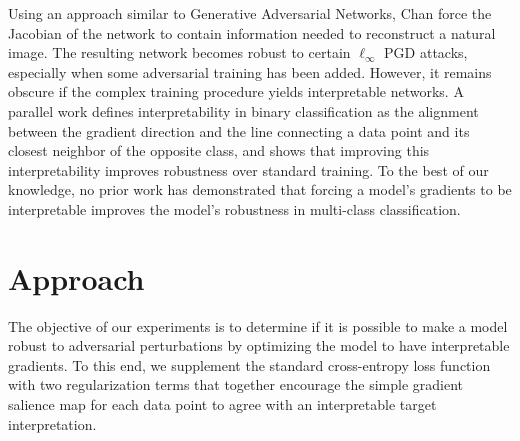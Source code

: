 Using an approach similar to Generative Adversarial Networks, Chan \etal \cite{JARN} force the Jacobian of the network to contain information needed to reconstruct a natural image. The resulting network becomes robust to certain $\ell_\infty$ PGD attacks, especially when some adversarial training has been added. However, it remains obscure if the complex training procedure yields interpretable networks. A parallel work \cite{lanfredi2020quantifying} defines interpretability in binary classification as the alignment between the gradient direction and the line connecting a data point and its closest neighbor of the opposite class, and shows that improving this interpretability improves robustness over standard training. To the best of our knowledge, no prior work has demonstrated that forcing a model's gradients to be interpretable improves the model's robustness in multi-class classification. 




\section{Approach} \label{sec:approach}
The objective of our experiments is to determine if it is possible to make a model robust to adversarial perturbations by optimizing the model to have interpretable gradients. To this end, we supplement the standard cross-entropy loss function with two regularization terms that together encourage the simple gradient salience map for each data point to agree with an interpretable target interpretation.

